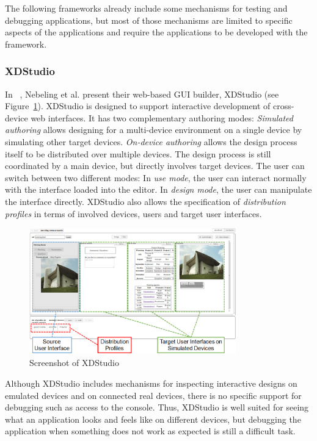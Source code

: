 The following frameworks already include some mechanisms for testing and debugging applications, but most of those mechanisms are limited to specific aspects of the applications and require the applications to be developed with the framework.

\subsubsection{XDStudio}

In ~\cite{xdstudio2014}, Nebeling et al. present their web-based GUI builder, XDStudio (see Figure~\ref{fig:xdstudio}). XDStudio is designed to support interactive development of cross-device web interfaces. It has two complementary authoring modes: \emph{Simulated authoring} allows designing for a multi-device environment on a single device by simulating other target devices. \emph{On-device authoring} allows the design process itself to be distributed over multiple devices. The design process is still coordinated by a main device, but directly involves target devices. The user can switch between two different modes: In \emph{use mode}, the user can interact normally with the interface loaded into the editor. In \emph{design mode}, the user can manipulate the interface directly. XDStudio also allows the specification of \emph{distribution profiles} in terms of involved devices, users and target user interfaces.

\begin{figure}[H]
  \centering
    \includegraphics[width=0.8\textwidth]{images/relatedwork/xdstudio.png}
	\caption[Screenshot: XDStudio]{Screenshot of XDStudio}
	\label{fig:xdstudio}
\end{figure}

Although XDStudio includes mechanisms for inspecting interactive designs on emulated devices and on connected real devices, there is no specific support for debugging such as access to the console. Thus, XDStudio is well suited for seeing what an application looks and feels like on different devices, but debugging the application when something does not work as expected is still a difficult task.

